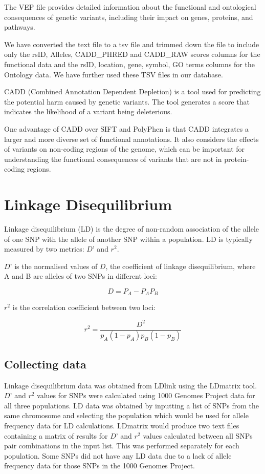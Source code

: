 \documentclass[12pt,a4paper]{article}
\newcommand{\sect}[1]{
\clearpage
\hypertarget{#1}{
\section{#1}\label{#1}}
}
\newcommand{\subsect}[1]{
\FloatBarrier %
\hypertarget{#1}{
\subsection{#1}\label{#1}}
}
\begin{document}
The VEP file provides detailed information about the functional and ontological consequences of genetic variants, including their impact on genes, proteins, and pathways.

We have converted the text file to a tsv file and trimmed down the file to include only the rsID, Alleles, CADD\_PHRED and CADD\_RAW scores columns for the functional data and the rsID, location, gene, symbol, GO terms columns for the Ontology data. We have further used these TSV files in our database.

CADD (Combined Annotation Dependent Depletion) is a tool used for predicting the potential harm caused by genetic variants. The tool generates a score that indicates the likelihood of a variant being deleterious.

One advantage of CADD over SIFT and PolyPhen is that CADD integrates a larger and more diverse set of functional annotations. It also considers the effects of variants on non-coding regions of the genome, which can be important for understanding the functional consequences of variants that are not in protein-coding regions.

\sect {Linkage Disequilibrium}

Linkage disequilibrium (LD) is the degree of non-random association of the allele of one SNP with the allele of another SNP within a population. LD is typically measured by two metrics: $D’$ and $r^2$.

$D’$ is the normalised values of $D$, the coefficient of linkage disequilibrium, where A and B are alleles of two SNPs in different loci:

\[D=P_A -  P_A P_B\]

$r^2$  is the correlation coefficient between two loci:

\[r^2 = \frac{D^2}{p_A(1-p_A)p_B(1-p_B)} \]


\subsect{Collecting data}

Linkage disequilibrium data was obtained from LDlink using the LDmatrix tool. $D’$ and $r^2$ values for SNPs were calculated using 1000 Genomes Project data for all three populations. LD data was obtained by inputting a list of SNPs from the same chromosome and selecting the population which would be used for allele frequency data for LD calculations. LDmatrix would produce two text files containing a matrix of results for $D’$ and $r^2$ values calculated between all SNPs pair combinations in the input list. This was performed separately for each population. Some SNPs did not have any LD data due to a lack of allele frequency data for those SNPs in the 1000 Genomes Project.
\end{document}
